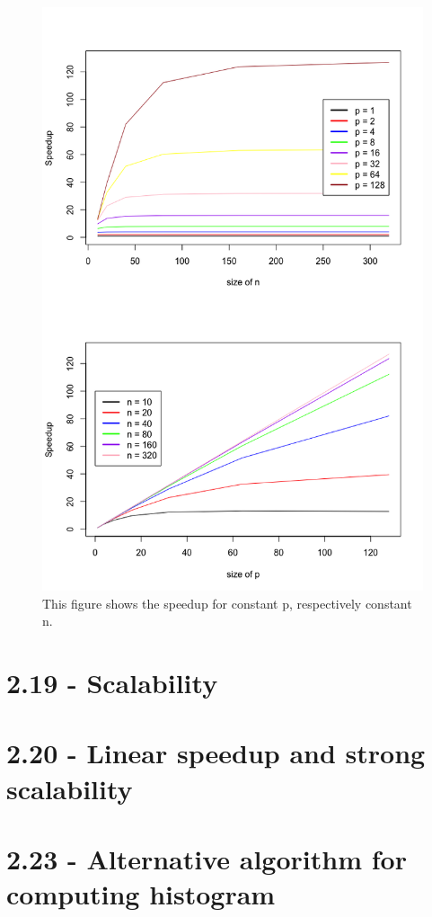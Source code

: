 \documentclass[a4paper,11pt,twoside]{article}
\begin{document}
\begin{figure}
  
  \centering
    \includegraphics[width=1\textwidth]{speedup.png}
    \caption{This figure shows the speedup for constant p, respectively constant n.}
    \label{fig:speedup}
\end{figure}

\section{2.19 - Scalability}
\section{2.20 - Linear speedup and strong scalability}
\section{2.23 - Alternative algorithm for computing histogram}

\end{document}
